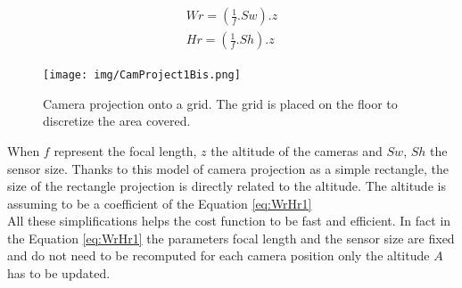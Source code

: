 	
	\begin{equation} \label{eq:WrHr1}
	\begin{split}
			Wr=(\frac{1}{f} . Sw).z\\
			Hr=(\frac{1}{f} . Sh).z
     \end{split} 
	\end{equation}
	
	\begin{figure}[t!]
		\centering
  		\texttt{[image: img/CamProject1Bis.png]}
  
 	 	\endminipage\hfill\caption{Camera projection onto a grid. The grid is placed on the floor to discretize 	the area covered.}\label{fig:cam_proj}
	\end{figure}




When $f$ represent the focal length, $z$ the altitude of the cameras and  $Sw$, $Sh$ the sensor size.
Thanks to this model of camera projection as a simple rectangle, the size of the rectangle projection is directly related to the altitude. The altitude is assuming to be a coefficient of the Equation \ref{eq:WrHr1}\\
All these simplifications helps the cost function to be fast and efficient.  In fact in the Equation \ref{eq:WrHr1} the parameters focal length and the sensor size are fixed and do not need to be recomputed for each camera position only the altitude $A$ has to be updated.\\

